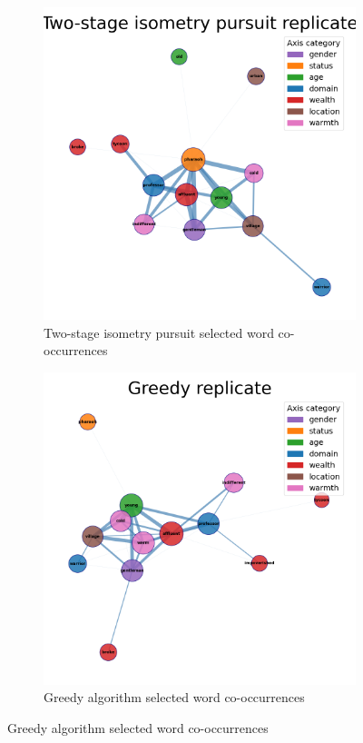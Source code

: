 \begin{figure}[h]
    \centering
    \begin{subfigure}[b]{0.47\textwidth}
        \centering
        \includegraphics[width=\textwidth]{../figures/ip_graph.png}
        \caption{Two-stage isometry pursuit selected word co-occurrences}
        \label{fig:co_occurrence_brute}
    \end{subfigure}
    \hfill
    \begin{subfigure}[b]{0.47\textwidth}
        \centering
        \includegraphics[width=\textwidth]{../figures/greedy_graph.png}
        \caption{Greedy algorithm selected word co-occurrences}
        \label{fig:co_occurrence_two_stage}
    \end{subfigure}
    

\end{figure}
